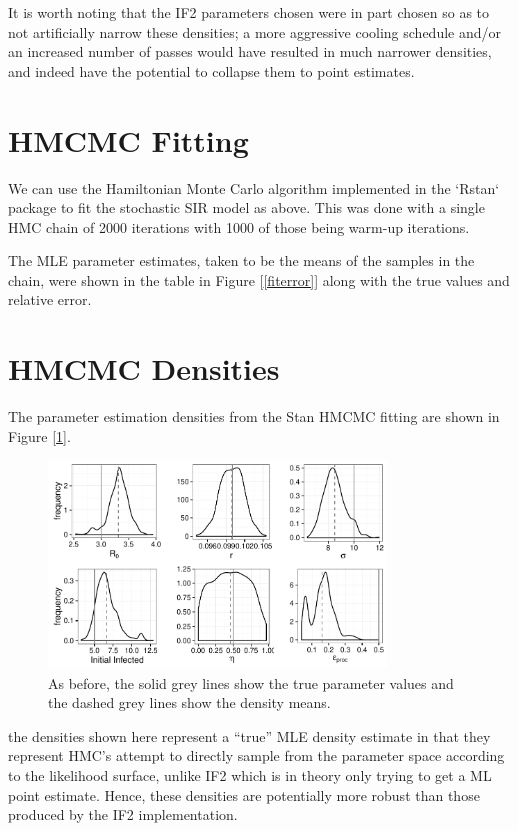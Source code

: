     It is worth noting that the IF2 parameters chosen were in part chosen so as to not artificially narrow these densities; a more aggressive cooling schedule and/or an increased number of passes would have resulted in much narrower densities, and indeed have the potential to collapse them to point estimates.


\section{HMCMC Fitting}

	We can use the Hamiltonian Monte Carlo algorithm implemented in the `Rstan` package to fit the stochastic SIR model as above. This was done with a single HMC chain of 2000 iterations with 1000 of those being warm-up iterations.

	The MLE parameter estimates, taken to be the means of the samples in the chain, were shown in the table in Figure [\ref{fiterror}] along with the true values and relative error.


\section{HMCMC Densities}

	The parameter estimation densities from the Stan HMCMC fitting are shown in Figure [\ref{sc1hmckernels}].

	\begin{figure}
        \centering
        \captionsetup{width=.8\linewidth}
        \includegraphics[width=0.8\textwidth]{./images/hmckernels.pdf}
        \caption{As before, the solid grey lines show the true parameter values and the dashed grey lines show the density means. \label{sc1hmckernels}}
    \end{figure}

    the densities shown here represent a ``true'' MLE density estimate in that they represent HMC's attempt to directly sample from the parameter space according to the likelihood surface, unlike IF2 which is in theory only trying to get a ML point estimate. Hence, these densities are potentially more robust than those produced by the IF2 implementation.


